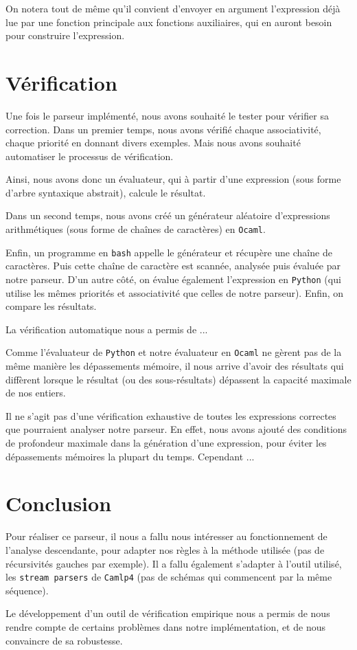 \documentclass[11pt]{article}
\begin{document}
On notera tout de même qu'il convient d'envoyer en argument l'expression déjà lue par une fonction principale aux fonctions auxiliaires, qui en auront besoin pour construire l'expression. 

\section{Vérification}
Une fois le parseur implémenté, nous avons souhaité le tester pour vérifier sa correction.
Dans un premier temps, nous avons vérifié chaque associativité, chaque priorité en donnant divers exemples. Mais nous avons souhaité automatiser le processus de vérification.


Ainsi, nous avons donc un évaluateur, qui à partir d'une expression (sous forme d'arbre syntaxique abstrait), calcule le résultat.

Dans un second temps, nous avons créé un générateur aléatoire d'expressions arithmétiques (sous forme de chaînes de caractères) en \texttt{Ocaml}.

Enfin, un programme en \texttt{bash} appelle le générateur et récupère une chaîne de caractères. Puis cette chaîne de caractère est scannée, analysée puis évaluée par notre parseur. D'un autre côté, on évalue également l'expression en \texttt{Python} (qui utilise les mêmes priorités et associativité que celles de notre parseur). Enfin, on compare les résultats.


La vérification automatique nous a permis de ... %

Comme l'évaluateur de \texttt{Python} et notre évaluateur en \texttt{Ocaml} ne gèrent pas de la même manière les dépassements mémoire, il nous arrive d'avoir des résultats qui diffèrent lorsque le résultat (ou des sous-résultats) dépassent la capacité maximale de nos entiers. 




Il ne s'agit pas d'une vérification exhaustive de toutes les expressions correctes que pourraient analyser notre parseur. En effet, nous avons ajouté des conditions de profondeur maximale dans la génération d'une expression, pour éviter les dépassements mémoires la plupart du temps. Cependant ...

\section{Conclusion}
Pour réaliser ce parseur, il nous a fallu nous intéresser au fonctionnement de l'analyse descendante, pour adapter nos règles à la méthode utilisée (pas de récursivités gauches par exemple). Il a fallu également s'adapter à l'outil utilisé, les \texttt{stream parsers} de \texttt{Camlp4} (pas de schémas qui commencent par la même séquence).

Le développement d'un outil de vérification empirique nous a permis de nous rendre compte de certains problèmes dans notre implémentation, et de nous convaincre de sa robustesse.
\end{document}

